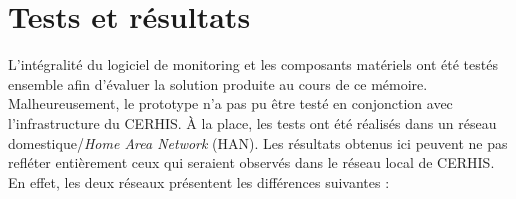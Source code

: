 \chapter{Tests et résultats}

\noindent
L'intégralité du logiciel de monitoring et les composants matériels ont été testés ensemble afin d'évaluer la solution produite au cours de ce mémoire. Malheureusement, le prototype n'a pas pu être testé en conjonction avec l'infrastructure du CERHIS. À la place, les tests ont été réalisés dans un réseau domestique/\textit{Home Area Network} (HAN). Les résultats obtenus ici peuvent ne pas refléter entièrement ceux qui seraient observés dans le réseau local de CERHIS. En effet, les deux réseaux présentent les différences suivantes :

\vspace{0.2cm}

